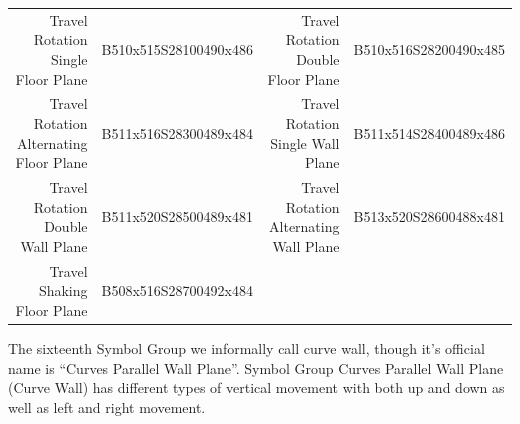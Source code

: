 \documentclass{article}
\begin{document}
\begin{center}
\begin{tabular}{rcrc}
Travel Rotation Single Floor Plane         &B510x515S28100490x486&Travel Rotation Double Floor Plane           &B510x516S28200490x485\\
Travel Rotation Alternating Floor Plane    &B511x516S28300489x484&Travel Rotation Single Wall Plane            &B511x514S28400489x486\\
Travel Rotation Double Wall Plane          &B511x520S28500489x481&Travel Rotation Alternating Wall Plane       &B513x520S28600488x481\\
Travel Shaking Floor Plane                 &B508x516S28700492x484\\
\end{tabular}
\end{center}

The sixteenth Symbol Group we informally call curve wall, though it's official name is ``Curves Parallel Wall Plane''.
Symbol Group Curves Parallel Wall Plane (Curve Wall) has different types of vertical movement with both up and down as well as left and right movement.
\end{document}
